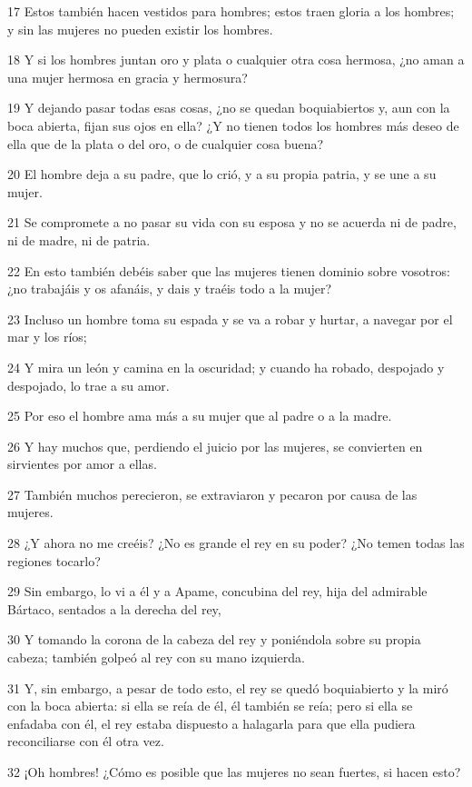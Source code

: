 \par 17 Estos también hacen vestidos para hombres; estos traen gloria a los hombres; y sin las mujeres no pueden existir los hombres.
\par 18 Y si los hombres juntan oro y plata o cualquier otra cosa hermosa, ¿no aman a una mujer hermosa en gracia y hermosura?
\par 19 Y dejando pasar todas esas cosas, ¿no se quedan boquiabiertos y, aun con la boca abierta, fijan sus ojos en ella? ¿Y no tienen todos los hombres más deseo de ella que de la plata o del oro, o de cualquier cosa buena?
\par 20 El hombre deja a su padre, que lo crió, y a su propia patria, y se une a su mujer.
\par 21 Se compromete a no pasar su vida con su esposa y no se acuerda ni de padre, ni de madre, ni de patria.
\par 22 En esto también debéis saber que las mujeres tienen dominio sobre vosotros: ¿no trabajáis y os afanáis, y dais y traéis todo a la mujer?
\par 23 Incluso un hombre toma su espada y se va a robar y hurtar, a navegar por el mar y los ríos;
\par 24 Y mira un león y camina en la oscuridad; y cuando ha robado, despojado y despojado, lo trae a su amor.
\par 25 Por eso el hombre ama más a su mujer que al padre o a la madre.
\par 26 Y hay muchos que, perdiendo el juicio por las mujeres, se convierten en sirvientes por amor a ellas.
\par 27 También muchos perecieron, se extraviaron y pecaron por causa de las mujeres.
\par 28 ¿Y ahora no me creéis? ¿No es grande el rey en su poder? ¿No temen todas las regiones tocarlo?
\par 29 Sin embargo, lo vi a él y a Apame, concubina del rey, hija del admirable Bártaco, sentados a la derecha del rey,
\par 30 Y tomando la corona de la cabeza del rey y poniéndola sobre su propia cabeza; también golpeó al rey con su mano izquierda.
\par 31 Y, sin embargo, a pesar de todo esto, el rey se quedó boquiabierto y la miró con la boca abierta: si ella se reía de él, él también se reía; pero si ella se enfadaba con él, el rey estaba dispuesto a halagarla para que ella pudiera reconciliarse con él otra vez.
\par 32 ¡Oh hombres! ¿Cómo es posible que las mujeres no sean fuertes, si hacen esto?
